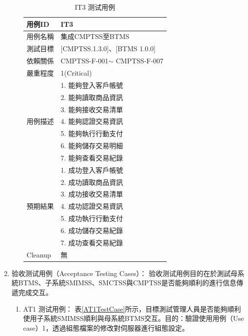 \begin{enumerate}
\begin{enumerate}
						\begin{table}[!htbp]
						\caption{IT3 测试用例} %
						\centering %
						\label{IT3TestCase} %
						\begin{tabular}{|l|l|}
						\hline
						用例ID & IT3 \\ \hline
						用例名稱 & 集成CMPTSS至BTMS \\ \hline
						測試目標 & {[}CMPTSS.1.3.0{]}、{[}BTMS 1.0.0{]} \\ \hline
						依賴關係 & CMPTSS-F-001$\sim$ CMPTSS-F-007 \\ \hline
						嚴重程度 & 1(Critical) \\ \hline
						\multirow{7}{*}{用例描述} & 1.     能夠登入客戶帳號 \\ \cline{2-2} 
						 & 2.     能夠讀取商品資訊 \\ \cline{2-2} 
						 & 3.     能夠接收交易清單 \\ \cline{2-2} 
						 & 4.     能夠認證交易資訊 \\ \cline{2-2} 
						 & 5.     能夠執行行動支付 \\ \cline{2-2} 
						 & 6.     能夠儲存交易明細 \\ \cline{2-2} 
						 & 7.     能夠查看交易紀錄 \\ \hline
						\multirow{7}{*}{預期結果} & 1.     成功登入客戶帳號 \\ \cline{2-2} 
						 & 2.     成功讀取商品資訊 \\ \cline{2-2} 
						 & 3.     成功接收交易清單 \\ \cline{2-2} 
						 & 4.     成功認證交易資訊 \\ \cline{2-2} 
						 & 5.     成功執行行動支付 \\ \cline{2-2} 
						 & 6.     成功儲存交易紀錄 \\ \cline{2-2} 
						 & 7.     成功查看交易紀錄 \\ \hline
						Cleanup & 無 \\ \hline
						\end{tabular}
						\end{table}
				\end{enumerate}

		\item 验收测试用例（Acceptance Testing Cases）：
			验收测试用例目的在於測試母系統BTMS、子系統SMIMSS、SMCTSS與CMPTSS是否能夠順利的進行信息傳遞完成交互。

			\begin{enumerate}
				\item AT1 测试用例：
					表\ref{AT1TestCase}所示，目標測試管理人員是否能夠順利使用子系統SMIMSS順利與母系統BTMS交互。目的：驗證使用用例（Use case）1，透過組態檔案的修改對伺服器進行組態設定。


\end{enumerate}
\end{enumerate}
